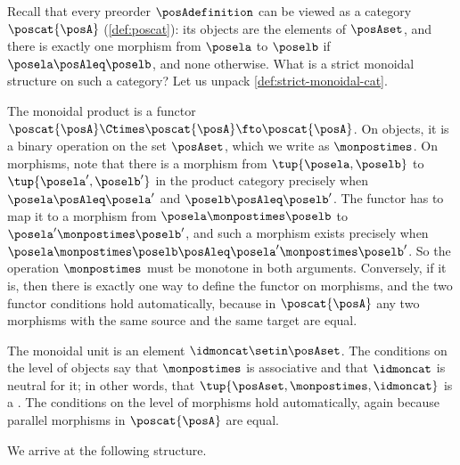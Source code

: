 Recall that every preorder $\posAdefinition$ can be viewed as a category $\poscat{\posA}$ (\cref{def:poscat}): its objects are the elements of $\posAset$, and there is exactly one morphism from $\posela$ to $\poselb$ if $\posela \posAleq \poselb$, and none otherwise.
What is a strict monoidal structure on such a category?
Let us unpack \cref{def:strict-monoidal-cat}.

The monoidal product is a functor $\poscat{\posA} \Ctimes \poscat{\posA} \fto \poscat{\posA}$.
On objects, it is a binary operation on the set $\posAset$, which we write as $\monpostimes$.
On morphisms, note that there is a morphism from $\tup{\posela, \poselb}$ to $\tup{\posela', \poselb'}$ in the product category precisely when $\posela \posAleq \posela'$ and $\poselb \posAleq \poselb'$.
The functor has to map it to a morphism from $\posela \monpostimes \poselb$ to $\posela' \monpostimes \poselb'$, and such a morphism exists precisely when $\posela \monpostimes \poselb \posAleq \posela' \monpostimes \poselb'$.
So the operation $\monpostimes$ must be monotone in both arguments.
Conversely, if it is, then there is exactly one way to define the functor on morphisms, and the two functor conditions hold automatically, because in $\poscat{\posA}$ any two morphisms with the same source and the same target are equal.

The monoidal unit is an element $\idmoncat \setin \posAset$.
The conditions on the level of objects say that $\monpostimes$ is associative and that $\idmoncat$ is neutral for it; in other words, that $\tup{\posAset, \monpostimes, \idmoncat}$ is a .
The conditions on the level of morphisms hold automatically, again because parallel morphisms in $\poscat{\posA}$ are equal.

We arrive at the following structure.

